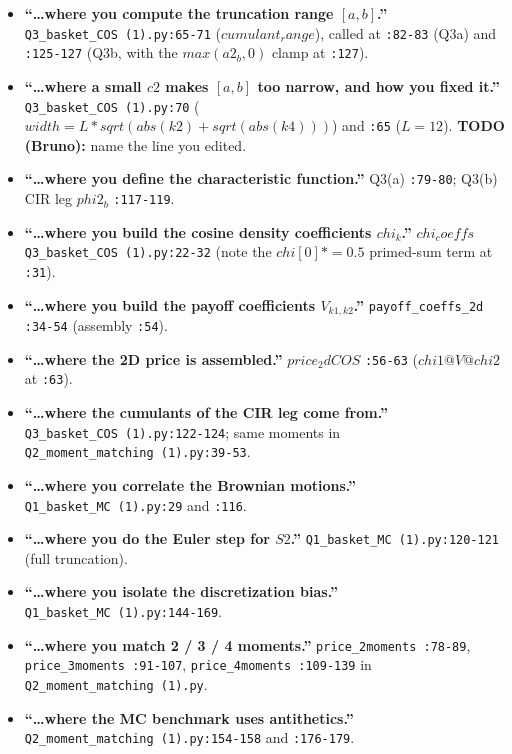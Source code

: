 \documentclass[
  11pt,
]{article}
\providecommand{\tightlist}{%
  \setlength{\itemsep}{0pt}\setlength{\parskip}{0pt}}
\begin{document}
\begin{itemize}
\tightlist
\item
  \textbf{``\ldots where you compute the truncation range \([a,b]\).''}
  \texttt{Q3\_basket\_COS\ (1).py:65-71} (\(cumulant_range\)), called at
  \texttt{:82-83} (Q3a) and \texttt{:125-127} (Q3b, with the
  \(max(a2_b, 0)\) clamp at \texttt{:127}).
\item
  \textbf{``\ldots where a small \(c2\) makes \([a,b]\) too narrow, and
  how you fixed it.''} \texttt{Q3\_basket\_COS\ (1).py:70}
  (\(width = L*sqrt(abs(k2) + sqrt(abs(k4)))\)) and \texttt{:65}
  (\(L=12\)). \textbf{TODO (Bruno):} name the line you edited.
\item
  \textbf{``\ldots where you define the characteristic function.''}
  Q3(a) \texttt{:79-80}; Q3(b) CIR leg \(phi2_b\) \texttt{:117-119}.
\item
  \textbf{``\ldots where you build the cosine density coefficients
  \(chi_k\).''} \(chi_coeffs\) \texttt{Q3\_basket\_COS\ (1).py:22-32}
  (note the \(chi[0] *= 0.5\) primed-sum term at \texttt{:31}).
\item
  \textbf{``\ldots where you build the payoff coefficients
  \(V_{k1,k2}\).''} \texttt{payoff\_coeffs\_2d} \texttt{:34-54}
  (assembly \texttt{:54}).
\item
  \textbf{``\ldots where the 2D price is assembled.''} \(price_2dCOS\)
  \texttt{:56-63} (\(chi1 @ V @ chi2\) at \texttt{:63}).
\item
  \textbf{``\ldots where the cumulants of the CIR leg come from.''}
  \texttt{Q3\_basket\_COS\ (1).py:122-124}; same moments in
  \texttt{Q2\_moment\_matching\ (1).py:39-53}.
\item
  \textbf{``\ldots where you correlate the Brownian motions.''}
  \texttt{Q1\_basket\_MC\ (1).py:29} and \texttt{:116}.
\item
  \textbf{``\ldots where you do the Euler step for \(S2\).''}
  \texttt{Q1\_basket\_MC\ (1).py:120-121} (full truncation).
\item
  \textbf{``\ldots where you isolate the discretization bias.''}
  \texttt{Q1\_basket\_MC\ (1).py:144-169}.
\item
  \textbf{``\ldots where you match 2 / 3 / 4 moments.''}
  \texttt{price\_2moments\ :78-89}, \texttt{price\_3moments\ :91-107},
  \texttt{price\_4moments\ :109-139} in
  \texttt{Q2\_moment\_matching\ (1).py}.
\item
  \textbf{``\ldots where the MC benchmark uses antithetics.''}
  \texttt{Q2\_moment\_matching\ (1).py:154-158} and \texttt{:176-179}.
\end{itemize}
\end{document}
